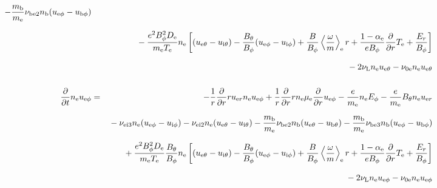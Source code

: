 \documentclass[11pt]{article}
\def\r#1{{\rm#1}}
\def\ddt{\frac{\partial}{\partial t}}
\def\ddr{\frac{\partial}{\partial r}}
\def\ave#1{\left\langle#1\right\rangle}
\def\me{m_\r{e}}
\def\mb{m_\r{b}}
\def\mue{\mu_\r{e}}
\def\mui{\mu_\r{i}}
\def\De{D_\r{e}}
\def\Di{D_\r{i}}
\def\nee{n_\r{e}}
\def\ni{n_\r{i}}
\def\nb{n_\r{b}}
\def\uer{u_{\r{e}r}}
\def\ueth{u_{\r{e}\theta}}
\def\uith{u_{\r{i}\theta}}
\def\ubth{u_{\r{b}\theta}}
\def\ueph{u_{\r{e}\phi}}
\def\uiph{u_{\r{i}\phi}}
\def\ubph{u_{\r{b}\phi}}
\def\Er{E_r}
\def\Eph{E_\phi}
\def\Bth{B_\theta}
\def\Bph{B_\phi}
\def\Te{T_\r{e}}
\def\Ti{T_\r{i}}
\def\Zi{Z_\r{i}}
\def\nune{\nu_\r{0e}}
\def\nuL{\nu_\r{L}}
\newcommand{\Frac}[2]{%
  {\displaystyle {\displaystyle #1\over \displaystyle #2}}%
}
\newcommand{\rdprd}[2]{\Frac{\partial #1}{\partial #2}}
\newcommand{\aveaveB}[1]{\left< \!\! \left< #1 \right> \!\! \right>}
\begin{document}
\begin{eqnarray}
%
  - \frac{\mb}{\me} \nu_\r{be2} \nb (\ueph - \ubph)
\nonumber\\[2.5mm]&&{}
%
  - \frac{e^2 \Bph^2 \De}{\me\Te}\nee
    \left[(\ueth - \uith) - \frac{\Bth}{\Bph}(\ueph - \uiph)
     + \frac{B}{\Bph}\ave{\frac{\omega}{m}}_\r{e} r
     + \frac{1-\alpha_\r{e}}{e\Bph}\ddr \Te + \frac{\Er}{\Bph}\right]
%
\nonumber\\[2.5mm]&&{}
%
%
  - 2 \nuL \nee \ueth
%
  - \nune \nee \ueth
%
%
\\[5mm]
  \ddt \nee \ueph &=&
%
  - \frac{1}{r} \ddr r \uer \nee \ueph
%
  + \frac{1}{r} \ddr r \nee \mue \ddr \ueph
%
  - \frac{e}{\me} \nee \Eph
%
  - \frac{e}{\me} \Bth \nee \uer 
\nonumber\\[2.5mm]&&{}
%
  - \nu_\r{ei3} \nee (\ueph - \uiph)
%
  - \nu_\r{ei2} \nee (\ueth - \uith)
%
  - \frac{\mb}{\me} \nu_\r{be2} \nb (\ueth - \ubth)
%
  - \frac{\mb}{\me} \nu_\r{be3} \nb (\ueph - \ubph)
\nonumber\\[2.5mm]&&{}
%
  + \frac{e^2 \Bph^2 \De}{\me\Te}\frac{\Bth}{\Bph}\nee
    \left[(\ueth - \uith) - \frac{\Bth}{\Bph}(\ueph - \uiph)
     + \frac{B}{\Bph}\ave{\frac{\omega}{m}}_\r{e}r
     + \frac{1-\alpha_\r{e}}{e\Bph}\ddr \Te + \frac{\Er}{\Bph}\right]
%
\nonumber\\[2.5mm]&&{}
%
  - 2 \nuL \nee \ueph
%
  - \nune \nee \ueph
%
%

\end{eqnarray}
\end{document}
